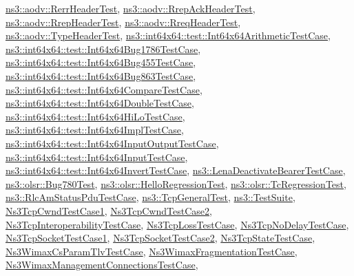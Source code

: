 \hyperlink{structns3_1_1aodv_1_1RerrHeaderTest}{ns3\+::aodv\+::\+Rerr\+Header\+Test}, \hyperlink{structns3_1_1aodv_1_1RrepAckHeaderTest}{ns3\+::aodv\+::\+Rrep\+Ack\+Header\+Test}, \hyperlink{structns3_1_1aodv_1_1RrepHeaderTest}{ns3\+::aodv\+::\+Rrep\+Header\+Test}, \hyperlink{structns3_1_1aodv_1_1RreqHeaderTest}{ns3\+::aodv\+::\+Rreq\+Header\+Test}, \hyperlink{structns3_1_1aodv_1_1TypeHeaderTest}{ns3\+::aodv\+::\+Type\+Header\+Test}, \hyperlink{classns3_1_1int64x64_1_1test_1_1Int64x64ArithmeticTestCase}{ns3\+::int64x64\+::test\+::\+Int64x64\+Arithmetic\+Test\+Case}, \hyperlink{classns3_1_1int64x64_1_1test_1_1Int64x64Bug1786TestCase}{ns3\+::int64x64\+::test\+::\+Int64x64\+Bug1786\+Test\+Case}, \hyperlink{classns3_1_1int64x64_1_1test_1_1Int64x64Bug455TestCase}{ns3\+::int64x64\+::test\+::\+Int64x64\+Bug455\+Test\+Case}, \hyperlink{classns3_1_1int64x64_1_1test_1_1Int64x64Bug863TestCase}{ns3\+::int64x64\+::test\+::\+Int64x64\+Bug863\+Test\+Case}, \hyperlink{classns3_1_1int64x64_1_1test_1_1Int64x64CompareTestCase}{ns3\+::int64x64\+::test\+::\+Int64x64\+Compare\+Test\+Case}, \hyperlink{classns3_1_1int64x64_1_1test_1_1Int64x64DoubleTestCase}{ns3\+::int64x64\+::test\+::\+Int64x64\+Double\+Test\+Case}, \hyperlink{classns3_1_1int64x64_1_1test_1_1Int64x64HiLoTestCase}{ns3\+::int64x64\+::test\+::\+Int64x64\+Hi\+Lo\+Test\+Case}, \hyperlink{classns3_1_1int64x64_1_1test_1_1Int64x64ImplTestCase}{ns3\+::int64x64\+::test\+::\+Int64x64\+Impl\+Test\+Case}, \hyperlink{classns3_1_1int64x64_1_1test_1_1Int64x64InputOutputTestCase}{ns3\+::int64x64\+::test\+::\+Int64x64\+Input\+Output\+Test\+Case}, \hyperlink{classns3_1_1int64x64_1_1test_1_1Int64x64InputTestCase}{ns3\+::int64x64\+::test\+::\+Int64x64\+Input\+Test\+Case}, \hyperlink{classns3_1_1int64x64_1_1test_1_1Int64x64InvertTestCase}{ns3\+::int64x64\+::test\+::\+Int64x64\+Invert\+Test\+Case}, \hyperlink{classns3_1_1LenaDeactivateBearerTestCase}{ns3\+::\+Lena\+Deactivate\+Bearer\+Test\+Case}, \hyperlink{classns3_1_1olsr_1_1Bug780Test}{ns3\+::olsr\+::\+Bug780\+Test}, \hyperlink{classns3_1_1olsr_1_1HelloRegressionTest}{ns3\+::olsr\+::\+Hello\+Regression\+Test}, \hyperlink{classns3_1_1olsr_1_1TcRegressionTest}{ns3\+::olsr\+::\+Tc\+Regression\+Test}, \hyperlink{classns3_1_1RlcAmStatusPduTestCase}{ns3\+::\+Rlc\+Am\+Status\+Pdu\+Test\+Case}, \hyperlink{classns3_1_1TcpGeneralTest}{ns3\+::\+Tcp\+General\+Test}, \hyperlink{classns3_1_1TestSuite}{ns3\+::\+Test\+Suite}, \hyperlink{classNs3TcpCwndTestCase1}{Ns3\+Tcp\+Cwnd\+Test\+Case1}, \hyperlink{classNs3TcpCwndTestCase2}{Ns3\+Tcp\+Cwnd\+Test\+Case2}, \hyperlink{classNs3TcpInteroperabilityTestCase}{Ns3\+Tcp\+Interoperability\+Test\+Case}, \hyperlink{classNs3TcpLossTestCase}{Ns3\+Tcp\+Loss\+Test\+Case}, \hyperlink{classNs3TcpNoDelayTestCase}{Ns3\+Tcp\+No\+Delay\+Test\+Case}, \hyperlink{classNs3TcpSocketTestCase1}{Ns3\+Tcp\+Socket\+Test\+Case1}, \hyperlink{classNs3TcpSocketTestCase2}{Ns3\+Tcp\+Socket\+Test\+Case2}, \hyperlink{classNs3TcpStateTestCase}{Ns3\+Tcp\+State\+Test\+Case}, \hyperlink{classNs3WimaxCsParamTlvTestCase}{Ns3\+Wimax\+Cs\+Param\+Tlv\+Test\+Case}, \hyperlink{classNs3WimaxFragmentationTestCase}{Ns3\+Wimax\+Fragmentation\+Test\+Case}, \hyperlink{classNs3WimaxManagementConnectionsTestCase}{Ns3\+Wimax\+Management\+Connections\+Test\+Case}, 